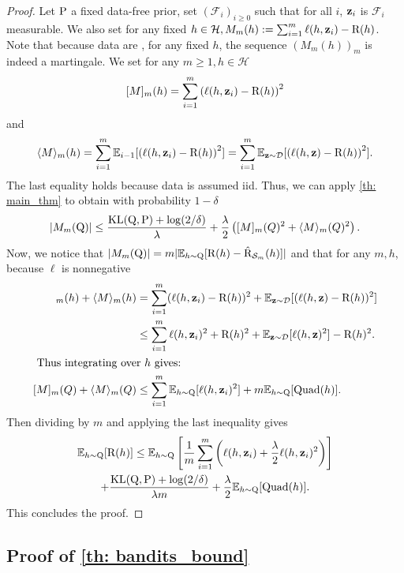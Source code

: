 \begin{proof}
Let $\P$ a fixed data-free prior, set $(\mathcal{F}_i)_{i\geq 0}$ such that for all $i$, $\z_i$ is $\mathcal{F}_i$ measurable. We also set for any fixed $h\in\mathcal{H}, M_m(h):= \sum_{i=1}^m \ell(h,\z_i) - \Risk(h)$. Note that because data are \iid, for any fixed $h$, the sequence $(M_m(h))_m$ is indeed a martingale.
We set for any $m\geq 1, h\in\mathcal{H}$
$$[M]_m(h) = \sum_{i=1}^m \left(\ell(h,\z_i) - \Risk(h)\right)^2 $$ and
$$\langle M \rangle_m(h) =  \sum_{i=1}^m \mathbb{E}_{i-1}[\left(\ell(h,\z_i) - \Risk(h)\right)^2] = \sum_{i=1}^m \mathbb{E}_{\z\sim \D}[\left(\ell(h,\z) - \Risk(h)\right)^2].$$
The last equality holds because data is assumed iid. Thus, we can apply \cref{th: main_thm} to obtain with probability $1-\delta$
\[|M_m(\Q)| \leq   \frac{\operatorname{KL}(\Q,\P) +\log(2/\delta)}{\lambda } + \frac{\lambda}{2}\left([M]_m(Q)^2 + \langle M\rangle_m(Q)^2 \right) . \]
Now, we notice that $|M_m(\Q)| = m| \mathbb{E}_{h\sim \Q}[\Risk(h) - \Riskhat_{\Sm}(h)] |$  and that  for any $m,h$, because $\ell$ is nonnegative
\begin{align*}
[M]_m(h) +  \langle M\rangle_m(h) & = \sum_{i=1}^m (\ell(h,\z_i) - \Risk(h))^2 + \mathbb{E}_{\z\sim \D}[ (\ell(h,\z) - \Risk(h))^2] \\
& \leq  \sum_{i=1}^m \ell(h,\z_i)^2 + \Risk(h)^2 + \mathbb{E}_{\z\sim \D}[\ell(h,\z)^2] - \Risk(h)^2.\\
\intertext{ Thus integrating over $h$ gives: }
[M]_m(Q) +  \langle M\rangle_m(Q) & \leq \sum_{i=1}^m \mathbb{E}_{h\sim \Q} [\ell(h,\z_i)^2] + m\mathbb{E}_{h\sim \Q} [\mathrm{Quad}(h)].
\end{align*}
Then dividing by $m$ and applying the last inequality gives
\begin{multline*}
\mathbb{E}_{h\sim \Q} [\Risk(h)]  \leq  \mathbb{E}_{h\sim \Q} \left[\frac{1}{m}\sum_{i=1}^m\left(\ell(h,\z_i) + \frac{\lambda}{2} \ell(h,\z_i)^2\right)\right] \\
+ \frac{\operatorname{KL}(\Q,\P) +\log(2/\delta)}{\lambda m} + \frac{\lambda}{2}\mathbb{E}_{h\sim \Q} [\mathrm{Quad}(h)].
\end{multline*}
This concludes the proof.
\end{proof}






\subsection{Proof of \cref{th: bandits_bound}}

